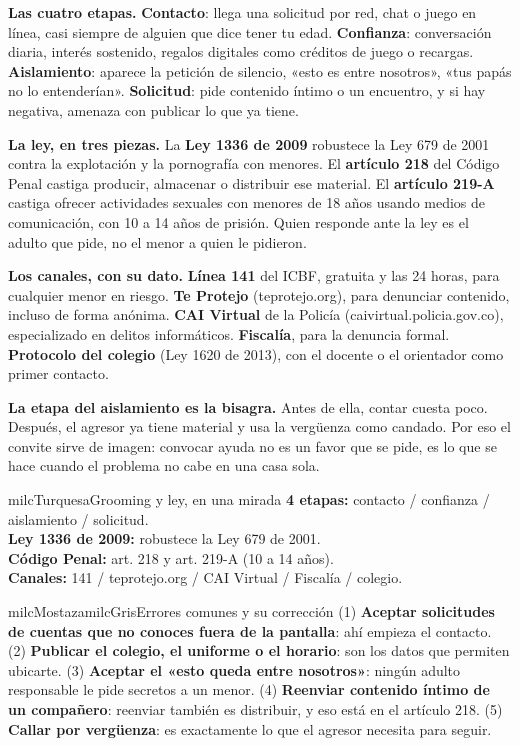 \documentclass[11pt,letterpaper]{article}
\newcommand{\milcpaso}[3]{%
\Needspace{4\baselineskip}%
\begin{tcolorbox}[enhanced,colback=white,colframe=milcLinea,arc=1.5mm,boxrule=.9pt,
  left=14mm,right=4mm,top=3mm,bottom=3mm,before skip=4pt,after skip=4pt,
  fontupper=\RaggedRight,
  overlay={\node[anchor=north west,circle,fill=#2,text=white,inner sep=0pt,
    minimum size=7.4mm,font=\sffamily\bfseries\small]
    at ([xshift=3.6mm,yshift=-3.2mm]frame.north west) {#1};}]
#3
\end{tcolorbox}}
\begin{document}
\milcpaso{1}{milcTurquesa}{\textbf{Las cuatro etapas.} \textbf{Contacto}: llega una solicitud por red, chat o juego en línea, casi siempre de alguien que dice tener tu edad. \textbf{Confianza}: conversación diaria, interés sostenido, regalos digitales como créditos de juego o recargas. \textbf{Aislamiento}: aparece la petición de silencio, «esto es entre nosotros», «tus papás no lo entenderían». \textbf{Solicitud}: pide contenido íntimo o un encuentro, y si hay negativa, amenaza con publicar lo que ya tiene.}
\milcpaso{2}{milcTurquesa}{\textbf{La ley, en tres piezas.} La \textbf{Ley 1336 de 2009} robustece la Ley 679 de 2001 contra la explotación y la pornografía con menores. El \textbf{artículo 218} del Código Penal castiga producir, almacenar o distribuir ese material. El \textbf{artículo 219-A} castiga ofrecer actividades sexuales con menores de 18 años usando medios de comunicación, con 10 a 14 años de prisión. Quien responde ante la ley es el adulto que pide, no el menor a quien le pidieron.}
\milcpaso{3}{milcTurquesa}{\textbf{Los canales, con su dato.} \textbf{Línea 141} del ICBF, gratuita y las 24 horas, para cualquier menor en riesgo. \textbf{Te Protejo} (teprotejo.org), para denunciar contenido, incluso de forma anónima. \textbf{CAI Virtual} de la Policía (caivirtual.policia.gov.co), especializado en delitos informáticos. \textbf{Fiscalía}, para la denuncia formal. \textbf{Protocolo del colegio} (Ley 1620 de 2013), con el docente o el orientador como primer contacto.}
\milcpaso{4}{milcTurquesa}{\textbf{La etapa del aislamiento es la bisagra.} Antes de ella, contar cuesta poco. Después, el agresor ya tiene material y usa la vergüenza como candado. Por eso el convite sirve de imagen: convocar ayuda no es un favor que se pide, es lo que se hace cuando el problema no cabe en una casa sola.}

\begin{drawbox}{milcTurquesa}{Grooming y ley, en una mirada}
\textbf{4 etapas:} contacto / confianza / aislamiento / solicitud. \\[1mm] \textbf{Ley 1336 de 2009:} robustece la Ley 679 de 2001. \\[1mm] \textbf{Código Penal:} art. 218 y art. 219-A (10 a 14 años). \\[1mm] \textbf{Canales:} 141 / teprotejo.org / CAI Virtual / Fiscalía / colegio.
\end{drawbox}

\begin{softbox}{milcMostaza}{milcGris}{Errores comunes y su corrección}
(1) \textbf{Aceptar solicitudes de cuentas que no conoces fuera de la pantalla}: ahí empieza el contacto. (2) \textbf{Publicar el colegio, el uniforme o el horario}: son los datos que permiten ubicarte. (3) \textbf{Aceptar el «esto queda entre nosotros»}: ningún adulto responsable le pide secretos a un menor. (4) \textbf{Reenviar contenido íntimo de un compañero}: reenviar también es distribuir, y eso está en el artículo 218. (5) \textbf{Callar por vergüenza}: es exactamente lo que el agresor necesita para seguir.
\end{softbox}
\end{document}

